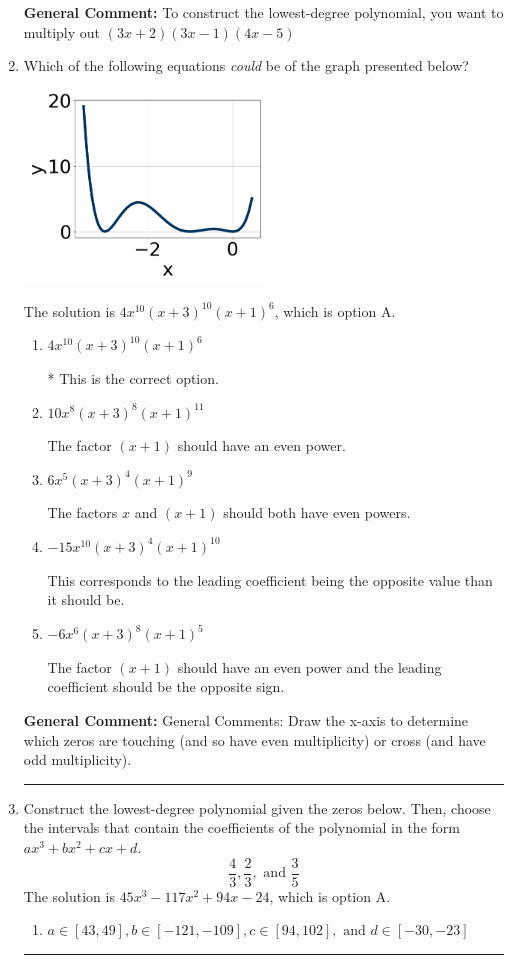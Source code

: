 \documentclass{extbook}[14pt]
\newcommand{\litem}[1]{\item #1

\rule{\textwidth}{0.4pt}}
\begin{document}
\begin{enumerate}
{\textbf{General Comment:} To construct the lowest-degree polynomial, you want to multiply out $(3x + 2)(3x -1)(4x -5)$
}
\litem{
Which of the following equations \textit{could} be of the graph presented below?

\begin{center}
    \includegraphics[width=0.5\textwidth]{../Figures/polyGraphToFunctionB.png}
\end{center}


The solution is \( 4x^{10} (x + 3)^{10} (x + 1)^{6} \), which is option A.\begin{enumerate}[label=\Alph*.]
\item \( 4x^{10} (x + 3)^{10} (x + 1)^{6} \)

* This is the correct option.
\item \( 10x^{8} (x + 3)^{8} (x + 1)^{11} \)

The factor $(x + 1)$ should have an even power.
\item \( 6x^{5} (x + 3)^{4} (x + 1)^{9} \)

The factors $x$ and $(x + 1)$ should both have even powers.
\item \( -15x^{10} (x + 3)^{4} (x + 1)^{10} \)

This corresponds to the leading coefficient being the opposite value than it should be.
\item \( -6x^{6} (x + 3)^{8} (x + 1)^{5} \)

The factor $(x + 1)$ should have an even power and the leading coefficient should be the opposite sign.
\end{enumerate}

\textbf{General Comment:} General Comments: Draw the x-axis to determine which zeros are touching (and so have even multiplicity) or cross (and have odd multiplicity).
}
\litem{
Construct the lowest-degree polynomial given the zeros below. Then, choose the intervals that contain the coefficients of the polynomial in the form $ax^3+bx^2+cx+d$.
\[ \frac{4}{3}, \frac{2}{3}, \text{ and } \frac{3}{5} \]The solution is \( 45x^{3} -117 x^{2} +94 x -24 \), which is option A.\begin{enumerate}[label=\Alph*.]
\item \( a \in [43, 49], b \in [-121, -109], c \in [94, 102], \text{ and } d \in [-30, -23] \)


\end{enumerate}}
\end{enumerate}
\end{document}
